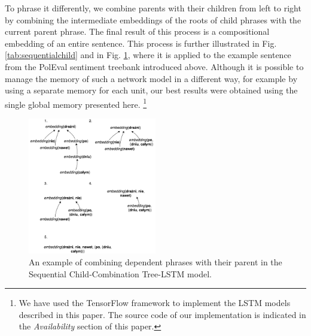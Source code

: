 \documentclass[10pt, a4paper]{article}
\begin{document}
To phrase it differently, we combine parents with their children from left to right by combining the intermediate embeddings of the roots of child phrases with the current parent phrase. The final result of this process is a compositional embedding of an entire sentence. This process is further illustrated in Fig. \ref{tab:sequentialchild} and in Fig. \ref{tab:niedrazniex}, where it is applied to the example sentence from the PolEval sentiment treebank introduced above. Although it is possible to manage the memory of such a network model in a different way, for example by using a separate memory for each unit, our best results were obtained using the single global memory presented here. \footnote{We have used the TensorFlow framework to implement the LSTM models described in this paper. The source code of our implementation is indicated in the \textit{Availability} section of this paper.}


\begin{figure}[h]
	\begin{center}
		\includegraphics[width=0.5\textwidth]{imgs/niedrazniex}
		\caption{An example of combining dependent phrases with their parent in the Sequential Child-Combination Tree-LSTM model.}
		\label{tab:niedrazniex}
	\end{center}
\end{figure}
	
\end{document}
